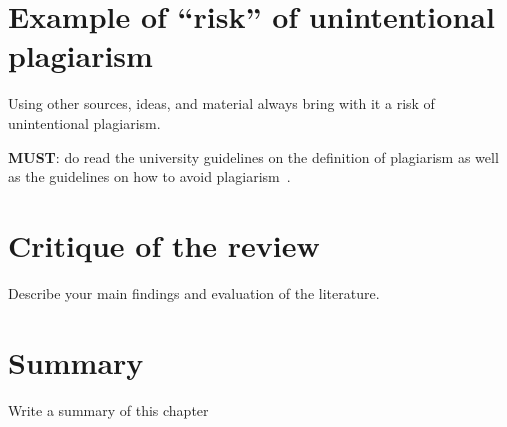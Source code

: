 \section{Example of ``risk'' of unintentional plagiarism}
Using other sources, ideas, and material always bring with it a risk of unintentional plagiarism. 

\noindent
\textbf{\color{red}MUST}: do read the university guidelines on the definition of plagiarism as well as the guidelines on how to avoid plagiarism~\citep{uor_plagiarism}.




\section{Critique of the review} %
Describe your main findings and evaluation of the literature. ~\\

\section{Summary} 
Write a summary of this chapter~\\
